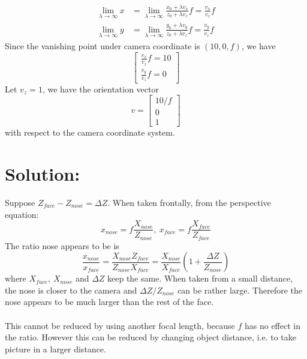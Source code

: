 \documentclass[12pt]{article}
\begin{document}
\begin{equation*}
\begin{aligned}
\lim\limits_{\lambda\to\infty}x &= \lim\limits_{\lambda\to\infty}\frac{x_0 + \lambda v_x}{z_0 + \lambda v_z}f = \frac{v_x}{v_z}f\\
\lim\limits_{\lambda\to\infty}y &= \lim\limits_{\lambda\to\infty}\frac{y_0 + \lambda v_y}{z_0 + \lambda v_z}f = \frac{v_y}{v_z}f
\end{aligned}
\end{equation*}
Since the vanishing point under camera coordinate is $(10, 0, f)$, we have
\begin{equation*}
\left[ \begin{array}{c}
\frac{v_x}{v_z}f=10\\
\frac{v_y}{v_z}f=0
\end{array} \right ]
\end{equation*}
Let $v_z = 1$, we have the orientation vector
\begin{equation*}
v = \left[ \begin{array}{c}
10/f\\
0\\
1
\end{array} \right ]
\end{equation*}
with respect to the camera coordinate system.
\section{Solution:}
\noindent Suppose $Z_{face} - Z_{nose} = \Delta Z$. When taken frontally, from the perspective equation:
\begin{equation*}
x_{nose} = f\frac{X_{nose}}{Z_{nose}},\ x_{face} = f\frac{X_{face}}{Z_{face}}
\end{equation*}
\noindent The ratio nose appears to be is 
\begin{equation*}
\frac{x_{nose}}{x_{face}} = \frac{X_{nose}Z_{face}}{Z_{nose}X_{face}} = \frac{X_{nose}}{X_{face}} \left(1 + \frac{\Delta Z}{Z_{nose}}\right )
\end{equation*}
\noindent where $X_{face},\ X_{nose}$ and $\Delta Z$ keep the same. When taken from a small distance, the nose is closer to the camera and $\Delta Z / Z_{nose}$ can be rather large. Therefore the nose appears to be much larger than the rest of the face.\\\\
This cannot be reduced by using another focal length, because $f$ has no effect in the ratio. However this can be reduced by changing object distance, i.e. to take picture in a larger distance.
\vfill
\clearpage
\end{document}

